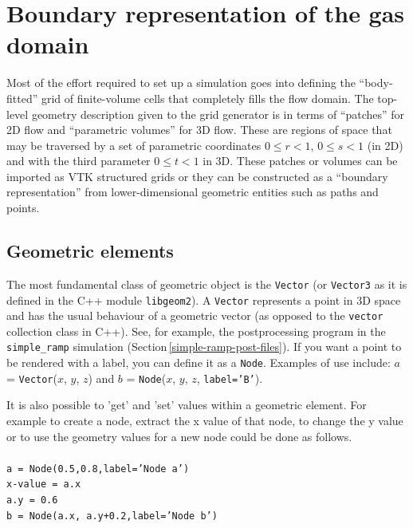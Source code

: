 \section{Boundary representation of the gas domain}
%
Most of the effort required to set up a simulation goes into defining the
``body-fitted'' grid of finite-volume cells that completely fills the flow
domain.
The top-level geometry description given to the grid generator is in terms of
``patches'' for 2D flow and ``parametric volumes'' for 3D flow.
These are regions of space that may be traversed by
a set of parametric coordinates $0 \le r < 1$, $0 \le s < 1$ (in 2D) and 
with the third parameter $0 \le t < 1$ in 3D.
These patches or volumes can be imported as VTK structured grids or they can be
constructed as a ``boundary representation'' from lower-dimensional 
geometric entities such as paths and points.

\subsection{Geometric elements}
%
The most fundamental class of geometric object is the \texttt{Vector} (or
\texttt{Vector3} as it is defined in the C++ module \texttt{libgeom2}).
A \texttt{Vector} represents a point in 3D space and has the usual behaviour 
of a geometric vector (as opposed to the \texttt{vector} collection class in
C++).
See, for example, the postprocessing program in the \texttt{simple\_ramp}
simulation (Section\,\ref{simple-ramp-post-files}).
If you want a point to be rendered with a label, you can define it as a
\texttt{Node}.
Examples of use include: $a$ = \texttt{Vector}($x$, $y$, $z$) and
$b$ = \texttt{Node}($x$, $y$, $z$, \texttt{label='B'}).

\medskip
It is also possible to 'get' and 'set' values within a geometric element. For example to
create a node, extract the x value of that node, to change the y value or to use
the geometry values for a new node could be done as follows.\\
\topbar\\
\texttt{a = Node(0.5,0.8,label='Node a')}\\
\texttt{x-value = a.x}\\
\texttt{a.y = 0.6}\\
\texttt{b = Node(a.x, a.y+0.2,label='Node b')}\\
\bottombar\\

